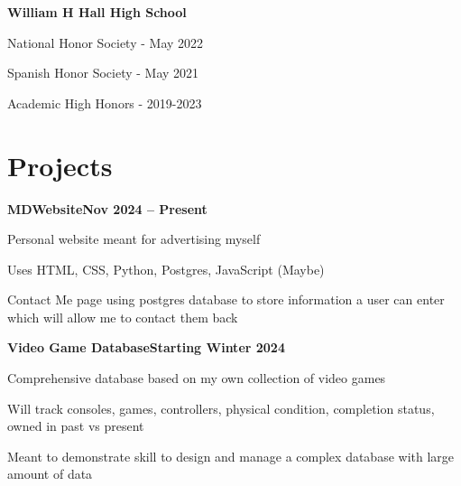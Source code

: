 \documentclass[letterpaper,10pt]{article}
\newcommand{\heading}[2]{
  \hspace{10pt}#1\hfill#2\\
}
\newcommand{\headingBf}[2]{
  \heading{\textbf{#1}}{\textbf{#2}}
}
\newenvironment{resume_list}{
  \vspace{-7pt}
  \begin{itemize}[itemsep=-2px, parsep=1pt, leftmargin=30pt]
}{
  \end{itemize}
}
\begin{document}
  \vspace{5pt}
  \headingBf{William H Hall High School}{}
  \begin{resume_list}
    \item National Honor Society \hspace{2pt}-  May 2022 
    \item Spanish Honor Society - May 2021
    \item Academic High Honors - 2019-2023
  \end{resume_list}


  \section{Projects}

  \headingBf{MDWebsite}{Nov 2024 -- Present}
  \begin{resume_list}
    \item Personal website meant for advertising myself
    \item Uses HTML, CSS, Python, Postgres, JavaScript (Maybe)
    \item Contact Me page using postgres database to store information a user can enter which will allow me to contact them back
  \end{resume_list}

  \headingBf{Video Game Database}{Starting Winter 2024}
  \begin{resume_list}
    \item Comprehensive database based on my own collection of video games
    \item Will track consoles, games, controllers, physical condition, completion status, owned in past vs present
    \item Meant to demonstrate skill to design and manage a complex database with large amount of data
  \end{resume_list}
\end{document}
